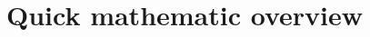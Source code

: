 \documentclass[11pt]{article}
\begin{document}




\section{Quick mathematic overview}
\end{document}

